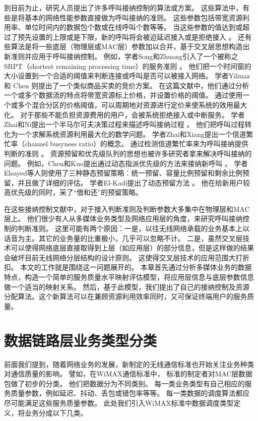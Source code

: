 到目前为止，研究人员提出了许多呼叫接纳控制的算法或方案。
这些算法中，有些是将基本的网络性能参数直接做为呼叫接纳的准则。
这些参数包括带宽资源利用率、单位时间内的数据包个数或在线呼叫个数等等。
当这些参数的值达到或超过了预先设置的上限或是下限，新的呼叫将会被迫延迟接入或是拒绝接入\cite{Y-Qian.TWC.2006} \cite{G-Djuka.TELSIK.2007}。
还有些算法是将一些底层（物理层或MAC层）参数加以合并，基于交叉层思想构造出新准则并应用于呼叫接纳控制。
例如，学者Song和Zhuang引入了一个被称之SRPT（shortest remaining processing time）的服务准则 \cite{Song2009}。
他们把一个时间窗的大小设置到一个合适的阈值来判断连接或呼叫是否可以被接入网络。
学者Yilmaz 和 Chen 则提出了一个类似商品买卖的竞价方案\cite{Yilmax2009}。
在这篇文献中，他们通过分析一个或多个数据流的特点将带宽资源标上价格，并设置价格的阈值。
通过使用一个或多个混合分区的价格阈值，可以周期地对资源进行定价来使系统的效用最大化。
对于那些不能负担资源费用的用户，会被系统拒绝接入或中断服务。
学者Zhai和Ni提出一个半马尔可夫决策过程来描述呼叫接纳过程 \cite{Zhai2005,Ni2009}。
他们把呼叫过程转化为一个求解系统资源利用最大化的数学问题。
学者Zhai和Xiang提出一个信道繁忙率（channel busyness ratio）的概念。
通过检测信道繁忙率来为呼叫接纳提供判断的准则 \cite{Zhai_Chen_Fang_2006}。
资源预留和优先级队列的思想也被许多研究者拿来解决呼叫接纳的问题。
例如，Chen和Kuo提出通过动态指派优先级的方法来接纳新呼叫 \cite{Chen_Kumar_Kuo_2003,Chen_Kuo_2004}。
学者Elsayed等人则使用了三种静态预留策略：统一预留、容量比例预留和剩余比例预留，并且做了详细的评估\cite{Elsayed02performanceevaluation}。
学者El-Kadi提出了动态预留方法 \cite{EL-Kadi2002}。
他在给新用户较高优先级的同时，采了“借和还”的预留策略。

在这些接纳控制文献中，对于接入判断准则及判断参数大多集中在物理层和MAC层上。
他们很少有人从多媒体业务类型及网络应用层的角度，来研究呼叫接纳控制的判断准则。
这里可能有两个原因：一是，以往无线网络承载的业务基本上以话音为主。其它的业务量的比重极小，几乎可以忽略不计。
二是，虽然交叉层技术可以使得网络底层直接取得到上层（如应用层）的部分信息，但是这样做的结果会破坏目前无线网络分层结构的设计原则。
这使得交叉层技术的应用范围大打折扣。
本文的工作就是围绕这一问题展开的。
本章首先通过分析多媒体业务的数据特点，构造一个简单的服务质量水平映射评估模型，将应用层信息与底层参数信息做一个适当的映射关系。
然后，基于此模型，我们提出了自己的接纳控制及资源分配算法。这个新算法可以在兼顾资源利用效率同时，又可保证终端用户的服务质量。
%
\section{数据链路层业务类型分类}
前面我们提到，随着网络业务的发展，新制定的无线通信标准也开始关注业务种类对通信质量的影响。
譬如，在WiMAX通信标准中，
标准的制定者对MAC层数据包做了初步的分类\cite{Tsagkaris_Demestichas_2009}\cite{Andrews_Ghosh_Muhamed_2007}。
他们把数据分为不同类别。
每一类业务类型有自己相应的服务质量参数，例如延迟、抖动、丢包或错包率等等。
每一类数据的调度算法都应尽可能满足这些服务质量参数。
此处我们引入WiMAX标准中数据调度类型定义，将业务分成以下几类。

